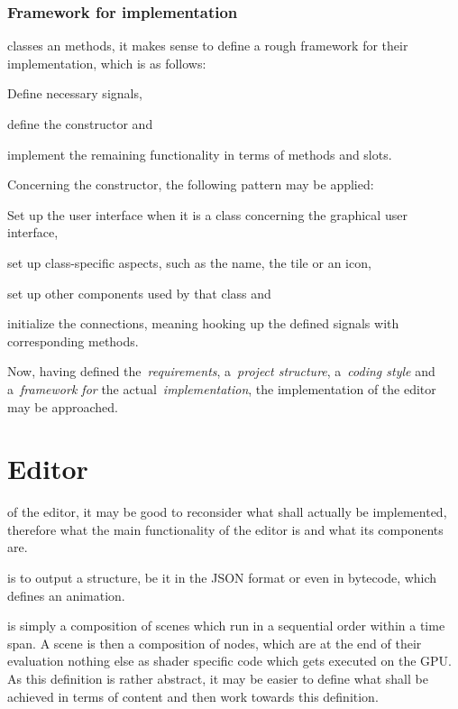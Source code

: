 \documentclass[%
    a4paper,    %
    justified,  %
    nobib,      %
    openany     %
]{tufte-book}
\begin{document}
\subsection{Framework for implementation}
\label{appendix:subsec:framework}

 classes an methods, it makes
sense to define a rough framework for their implementation, which is as follows:
\begin{enumerate*}
  \item Define necessary signals,
  \item define the constructor and
  \item implement the remaining functionality in terms of methods and slots.
\end{enumerate*}
Concerning the constructor, the following pattern may be applied:
\begin{enumerate*}
  \item Set up the user interface when it is a class concerning the graphical
    user interface,
  \item set up class-specific aspects, such as the name, the tile or an icon,
  \item set up other components used by that class and
  \item initialize the connections, meaning hooking up the defined signals
    with corresponding methods.
\end{enumerate*}

Now, having defined the~\emph{requirements}, a~\emph{project structure},
a~\emph{coding style} and a~\emph{framework for} the
actual~\emph{implementation}, the implementation of the editor may be
approached.

\chapter{Editor}
\label{appendix:chap:editor}

 of the editor, it may
be good to reconsider what shall actually be implemented, therefore what the
main functionality of the editor is and what its components are.

 is to output a structure, be it in
the JSON format or even in bytecode, which defines an animation.

 is simply a composition of scenes which run in a
sequential order within a time span. A scene is then a composition of nodes,
which are at the end of their evaluation nothing else as shader specific code
which gets executed on the GPU. As this definition is rather abstract, it may be
easier to define what shall be achieved in terms of content and then work
towards this definition.
\end{document}
